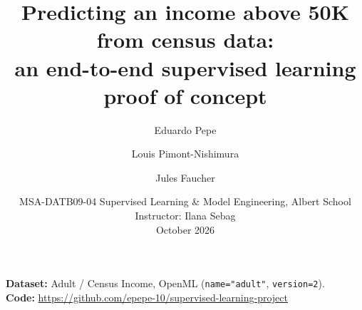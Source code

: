 \documentclass[11pt,a4paper]{article}
\title{Predicting an income above 50K from census data:\\
an end-to-end supervised learning proof of concept}
\author{Eduardo Pepe \and Louis Pimont-Nishimura \and Jules Faucher}
\date{MSA-DATB09-04 Supervised Learning \& Model Engineering, Albert School\\
Instructor: Ilana Sebag\\[4pt] October 2026}
\newcommand{\code}[1]{\texttt{#1}}
\begin{document}
\maketitle

\noindent\textbf{Dataset:} Adult / Census Income, OpenML (\code{name="adult"}, \code{version=2}).\\
\textbf{Code:} \url{https://github.com/epepe-10/supervised-learning-project}















\clearpage
\appendix

\end{document}
